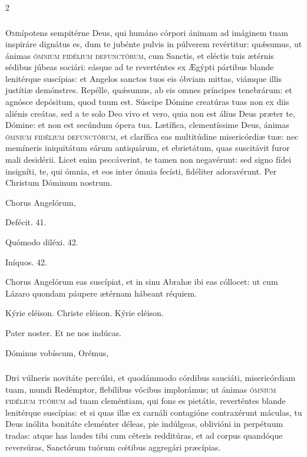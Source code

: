 \documentclass[9pt,twoside]{extarticle}
\begin{document}
\begin{multicols}{2}
\subsubsection*{\center {}}
\lettrine{O}mnípotens sempitérne Deus, qui humáno córpori ánimam ad imáginem tuam inspiráre dignátus es, dum te jubénte pulvis in púlverem revértitur: quǽsumus, ut ánimas \textsc{ómnium fidélium defunctórum}, cum Sanctis, et eléctis tuis ætérnis sédibus júbeas sociári: eásque ad te reverténtes ex Ægýpti pártibus blande lenitérque suscípias: et Angelos sanctos tuos eis óbviam mittas, viámque illis justítiæ demónstres. Repélle, quǽsumus, ab eis omnes príncipes tenebrárum: et agnósce depósitum, quod tuum est. Súscipe Dómine creatúras tuas non ex diis aliénis creátas, sed a te solo Deo vivo et vero, quia non est álius Deus præter te, Dómine: et non est secúndum ópera tua. Lætífica, clementíssime Deus, ánimas \textsc{ómnium fidélium defunctórum}, et clarífica eas multitúdine misericórdiæ tuæ: nec memíneris iniquitátum eárum antiquárum, et ebrietátum, quas suscitávit furor mali desidérii. Licet enim peccáverint, te tamen non negavérunt: sed signo fídei insigníti, te, qui ómnia, et eos inter ómnia fecísti, fidéliter adoravérunt. Per Christum Dóminum nostrum.

\begin{tightlist}{}
\item {} Chorus Angelórum, 
\item {} Defécit. 41.
\item {} Quómodo diléxi. 42.
\item {} Iníquos. 42.
\item {} Chorus Angelórum eas suscípiat, et in sinu Abrahæ ibi eas cóllocet: ut cum Lázaro quondam páupere ætérnam hábeant réquiem.
\item Kýrie eléison. Christe eléison. Kýrie eléison.
\item Pater noster. Et ne nos indúcas.
\item {} Dóminus vobíscum,  Orémus, 
\end{tightlist}

\subsubsection*{\center {}}
\lettrine{D}iri vúlneris novitáte percúlsi, et quodámmodo córdibus sauciáti, misericórdiam tuam, mundi Redémptor, flebílibus vócibus implorámus; ut ánimas \textsc{ómnium fidélium tuórum} ad tuam cleméntiam, qui fons es pietátis, reverténtes blande lenitérque suscípias: et si quas illæ ex carnáli contagióne contraxérunt máculas, tu Deus inólita bonitáte cleménter déleas, pie indúlgeas, oblivióni in perpétuum tradas: atque has laudes tibi cum céteris redditúras, et ad corpus quandóque reversúras, Sanctórum tuórum cœ́tibus aggregári præcípias.


\end{multicols}
\end{document}
